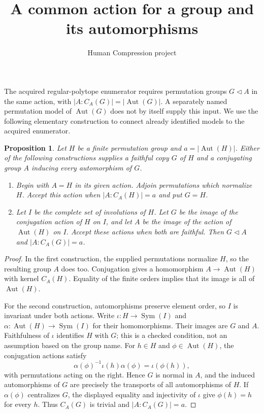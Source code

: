 \documentclass[11pt,a4paper]{article}
\title{A common action for a group and its automorphisms}
\author{Human Compression project}\date{}
\newtheorem{proposition}{Proposition}
\begin{document}
\maketitle
The acquired regular-polytope enumerator requires permutation groups
$G\mathrel{\triangleleft}A$ in the same action, with
$|A:C_A(G)|=|\operatorname{Aut}(G)|$. A separately named permutation
model of $\operatorname{Aut}(G)$ does not by itself supply this input.
We use the following elementary construction to connect already
identified models to the acquired enumerator.

\begin{proposition}
Let $H$ be a finite permutation group and $a=|\operatorname{Aut}(H)|$.
Either of the following constructions supplies a faithful copy $G$ of
$H$ and a conjugating group $A$ inducing every automorphism of $G$.
\begin{enumerate}
\item Begin with $A=H$ in its given action. Adjoin permutations which
normalize $H$. Accept this action when $|A:C_A(H)|=a$ and put $G=H$.
\item Let $I$ be the complete set of involutions of $H$. Let $G$ be the
image of the conjugation action of $H$ on $I$, and let $A$ be the image
of the action of $\operatorname{Aut}(H)$ on $I$. Accept these actions
when both are faithful. Then $G\mathrel{\triangleleft}A$ and
$|A:C_A(G)|=a$.
\end{enumerate}
\end{proposition}
\begin{proof}
In the first construction, the supplied permutations normalize $H$, so
the resulting group $A$ does too. Conjugation gives a homomorphism
$A\to\operatorname{Aut}(H)$ with kernel $C_A(H)$. Equality of the
finite orders implies that its image is all of $\operatorname{Aut}(H)$.

For the second construction, automorphisms preserve element order, so
$I$ is invariant under both actions. Write
$\iota:H\to\operatorname{Sym}(I)$ and
$\alpha:\operatorname{Aut}(H)\to\operatorname{Sym}(I)$ for their
homomorphisms. Their images are $G$ and $A$. Faithfulness of $\iota$
identifies $H$ with $G$; this is a checked condition, not an assumption
based on the group name. For $h\in H$ and $\phi\in\operatorname{Aut}(H)$,
the conjugation actions satisfy
\[
 \alpha(\phi)^{-1}\iota(h)\alpha(\phi)=\iota(\phi(h)),
\]
with permutations acting on the right. Hence $G$ is normal in $A$,
and the induced automorphisms of $G$ are precisely the transports of
all automorphisms of $H$. If $\alpha(\phi)$ centralizes $G$, the
displayed equality and injectivity of $\iota$ give $\phi(h)=h$ for
every $h$. Thus $C_A(G)$ is trivial and $|A:C_A(G)|=a$.
\end{proof}
\end{document}
